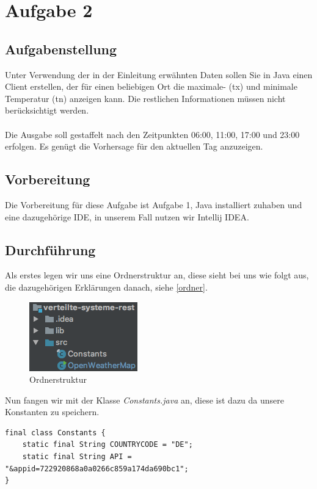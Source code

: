 \newpage

\section{Aufgabe 2}

\subsection{Aufgabenstellung}
Unter Verwendung der in der Einleitung erwähnten Daten sollen Sie in Java einen Client erstellen, der für einen beliebigen Ort die maximale- (tx) und minimale Temperatur (tn) anzeigen kann. Die restlichen Informationen müssen nicht berücksichtigt werden.\\\\Die Ausgabe soll gestaffelt nach den Zeitpunkten 06:00, 11:00, 17:00 und 23:00 erfolgen. Es genügt die Vorhersage für den aktuellen Tag anzuzeigen.

\subsection{Vorbereitung}
Die Vorbereitung für diese Aufgabe ist Aufgabe 1, Java installiert zuhaben und eine dazugehörige IDE, in unserem Fall nutzen wir Intellij IDEA.

\subsection{Durchführung}
Als erstes legen wir uns eine Ordnerstruktur an, diese sieht bei uns wie folgt aus, die dazugehörigen Erklärungen danach, siehe \autoref{ordner}.
\begin{figure}[H]
	\centering
	\includegraphics[width=0.2 \linewidth]{images/struktur_rest}
	\caption{Ordnerstruktur} \label{ordner}
\end{figure} 

Nun fangen wir mit der Klasse \textit{Constants.java} an, diese ist dazu da unsere Konstanten zu speichern.

\begin{lstlisting}
final class Constants {
    static final String COUNTRYCODE = "DE";
    static final String API = "&appid=722920868a0a0266c859a174da690bc1";
}
\end{lstlisting}

